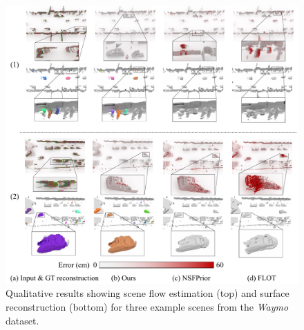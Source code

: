 \begin{figure}[t]
     \centering
        \includegraphics[width=\columnwidth]{figs/figure/supp_waymo.pdf}
       \caption{Qualitative results showing scene flow estimation (top) and surface reconstruction (bottom) for three example scenes from the \emph{Waymo} dataset.}
   \label{fig:supp_waymo}
\end{figure}